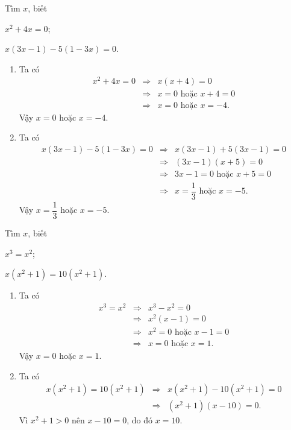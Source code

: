 \begin{vd}
	Tìm $x$, biết
	\begin{listEX}[2] 
		\item $x^2 +4x=0$;
		\item $x(3x-1)-5(1-3x)=0$.
	\end{listEX}
	\loigiai
	{
		\begin{enumerate}
			\item Ta có {\allowdisplaybreaks\begin{eqnarray*}
					x^2 +4x=0 &\Rightarrow& x(x+4)=0\\
					&\Rightarrow& x=0 \text{ hoặc } x+4=0\\
						&\Rightarrow& x=0 \text{ hoặc } x=-4.
			\end{eqnarray*}}
		Vậy $x=0$ hoặc $x=-4$.
			\item Ta có {\allowdisplaybreaks\begin{eqnarray*}
				x(3x-1)-5(1-3x)=0 &\Rightarrow& x(3x-1)+5(3x-1)=0\\
				&\Rightarrow& (3x-1)(x+5)=0\\
				&\Rightarrow& 3x-1=0 \text{ hoặc } x+5=0\\
					&\Rightarrow& x= \dfrac{1}{3} \text{ hoặc } x=-5.
			\end{eqnarray*}}
		Vậy $ x= \dfrac{1}{3}$ hoặc $x=-5$.
		\end{enumerate}	
	}
\end{vd}

\begin{vd}
		Tìm $x$, biết
	\begin{listEX}[2] 
		\item $x^3=x^2$;
		\item $x\left( x^2+1\right) =10\left( x^2+1\right)$.
	\end{listEX}
	\loigiai
	{
		\begin{enumerate}
			\item Ta có {\allowdisplaybreaks\begin{eqnarray*}
				x^3=x^2 	&\Rightarrow& x^3-x^2=0\\
				&\Rightarrow& x^2 (x-1)=0\\
				&\Rightarrow& x^2 =0 \text{ hoặc } x-1=0\\
				&\Rightarrow& x =0 \text{ hoặc } x=1.	
			\end{eqnarray*}}
		Vậy $x=0$ hoặc $x=1$.
			\item Ta có {\allowdisplaybreaks\begin{eqnarray*}
				x\left( x^2+1\right) =10\left( x^2+1\right) 	&\Rightarrow&  	x\left( x^2+1\right) -10\left( x^2+1\right) =0\\
				&\Rightarrow&  	\left( x^2+1\right) (x-10)=0.
			\end{eqnarray*}}
		Vì $x^2+1>0$ nên $x-10=0$, do đó $x=10$.
		\end{enumerate}	
	}
\end{vd}

